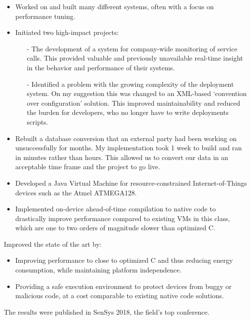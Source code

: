 \documentclass[10pt,a4paper]{../altacv}
\begin{document}
\medskip

\begin{itemize}
	\item Worked on and built many different systems, often with a focus on performance tuning.
	\item Initiated two high-impact projects:
	\begin{itemize}
		\item[-] The development of a system for company-wide monitoring of service calls. This provided valuable and previously unavailable real-time insight in the behavior and performance of their systems.
		\item[-] Identified a problem with the growing complexity of the deployment system. On my suggestion this was changed to an XML-based ‘convention over configuration' solution. This improved maintainability and reduced the burden for developers, who no longer have to write deployments scripts.
	\end{itemize}
	\item Rebuilt a database conversion that an external party had been working on unsuccessfully for months. My implementation took 1 week to build and ran in minutes rather than hours. This allowed us to convert our data in an acceptable time frame and the project to go live.
\end{itemize}

\medskip


\medskip\medskip{}

\begin{itemize}
	\item Developed a Java Virtual Machine for resource-constrained Internet-of-Things devices such as the Atmel ATMEGA128.
	\item Implemented on-device ahead-of-time compilation to native code to drastically improve performance compared to existing VMs in this class, which are one to two orders of magnitude slower than optimized C.
\end{itemize}

Improved the state of the art by:

\medskip

\begin{itemize}
	\item Improving performance to close to optimized C and thus reducing energy consumption, while maintaining platform independence.
	\item Providing a safe execution environment to protect devices from buggy or malicious code, at a cost comparable to existing native code solutions.
\end{itemize}

\medskip

The results were published in SenSys 2018, the field's top conference.

\medskip


\medskip
\end{document}

